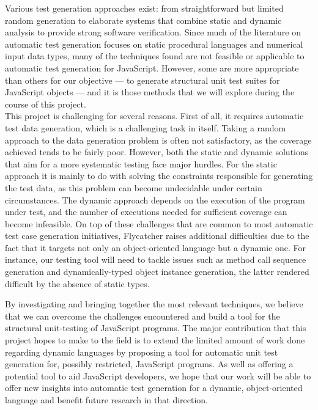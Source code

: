 \documentclass[a4paper,11pt,titlepage]{report}
\begin{document}
Various test generation approaches exist: from straightforward but limited random generation to elaborate systems that combine static and dynamic analysis to provide strong software verification. Since much of the literature on automatic test generation focuses on static procedural languages and numerical input data types, many of the techniques found are not feasible or applicable to automatic test generation for JavaScript. However, some are more appropriate than others for our objective --- to generate structural unit test suites for JavaScript objects --- and it is those methods that we will explore during the course of this project.\\

This project is challenging for several reasons. First of all, it requires automatic test data generation, which is a challenging task in itself. Taking a random approach to the data generation problem is often not satisfactory, as the coverage achieved tends to be fairly poor. However, both the static and dynamic solutions that aim for a more systematic testing face major hurdles. For the static approach it is mainly to do with solving the constraints responsible for generating the test data, as this problem can become undecidable under certain circumstances. The dynamic approach depends on the execution of the program under test, and the number of executions needed for sufficient coverage can become infeasible. On top of these challenges that are common to most automatic test case generation initiatives, \textsf{Flycatcher} raises additional difficulties due to the fact that it targets not only an object-oriented language but a dynamic one. For instance, our testing tool will need to tackle issues such as method call sequence generation and dynamically-typed object instance generation, the latter rendered difficult by the absence of static types.

By investigating and bringing together the most relevant techniques, we believe that we can overcome the challenges encountered and build a tool for the structural unit-testing of JavaScript programs. The major contribution that this project hopes to make to the field is to extend the limited amount of work done regarding dynamic languages by proposing a tool for automatic unit test generation for, possibly restricted, JavaScript programs. As well as offering a potential tool to aid JavaScript developers, we hope that our work will be able to offer new insights into automatic test generation for a dynamic, object-oriented language and benefit future research in that direction.
\end{document}
